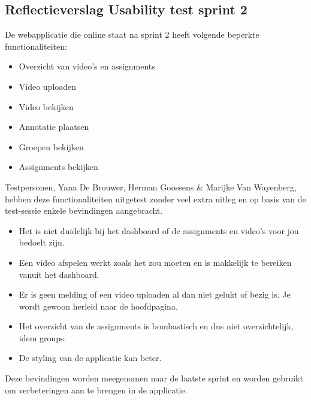 \subsection{Reflectieverslag Usability test sprint 2}
De webapplicatie die online staat na sprint 2 heeft volgende beperkte functionaliteiten:
\begin{itemize}
\item Overzicht van video's en assignments
\item Video uploaden
\item Video bekijken
\item Annotatie plaatsen
\item Groepen bekijken
\item Assignments bekijken
\end{itemize}

Testpersonen, Yana De Brouwer, Herman Goossens \& Marijke Van Wayenberg, hebben deze functionaliteiten uitgetest zonder veel extra uitleg en op basis van de test-sessie enkele bevindingen aangebracht.
\begin{itemize}
\item Het is niet duidelijk bij het dashboard of de assignments en video's voor jou bedoelt zijn.
\item Een video afspelen werkt zoals het zou moeten en is makkelijk te bereiken vanuit het dashboard.
\item Er is geen melding of een video uploaden al dan niet gelukt of bezig is. Je wordt gewoon herleid naar de hoofdpagina.
\item Het overzicht van de assignments is bombastisch en dus niet overzichtelijk, idem groups.
\item De styling van de applicatie kan beter.
\end{itemize}

Deze bevindingen worden meegenomen naar de laatste sprint en worden gebruikt om verbeteringen aan te brengen in de applicatie.
